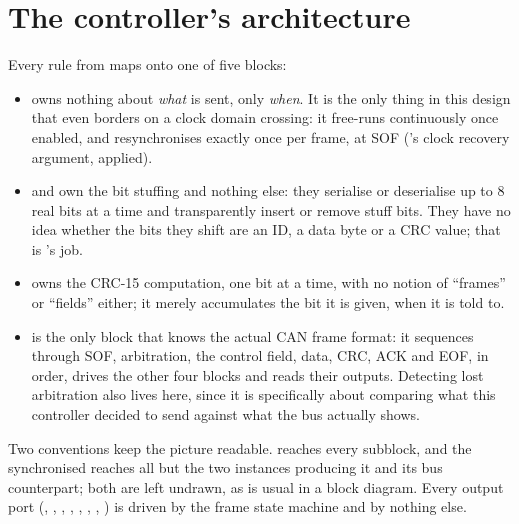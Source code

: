 
\section{The controller's architecture}
\label{c11:sec:arch}

Every rule from  maps onto one of five blocks:
\begin{itemize}
  \item \textbf{} owns nothing about \emph{what} is sent, only \emph{when}. It is the
    only thing in this design that even borders on a clock domain crossing: it free-runs continuously
    once enabled, and resynchronises exactly once per frame, at SOF ('s
    clock recovery argument, applied).
  \item \textbf{} and \textbf{} own the bit stuffing and
    nothing else: they serialise or deserialise up to 8 real bits at a time and transparently insert
    or remove stuff bits. They have no idea whether the bits they shift are an ID, a data byte or a
    CRC value; that is 's job.
  \item \textbf{} owns the CRC-15 computation, one bit at a time, with no notion of
    ``frames'' or ``fields'' either; it merely accumulates the bit it is given, when it is told to.
  \item \textbf{} is the only block that knows the actual CAN frame format: it
    sequences through SOF, arbitration, the control field, data, CRC, ACK and EOF, in order, drives
    the other four blocks and reads their outputs. Detecting lost arbitration also lives here, since
    it is specifically about comparing what this controller decided to send against what the bus
    actually shows.
\end{itemize}


Two conventions keep the picture readable.  reaches every subblock, and the synchronised
 reaches all but the two  instances producing it and its bus
counterpart; both are left undrawn, as is usual in a block diagram. Every output port
(, , , , , ,
, ) is driven by the frame state machine and by nothing else.

